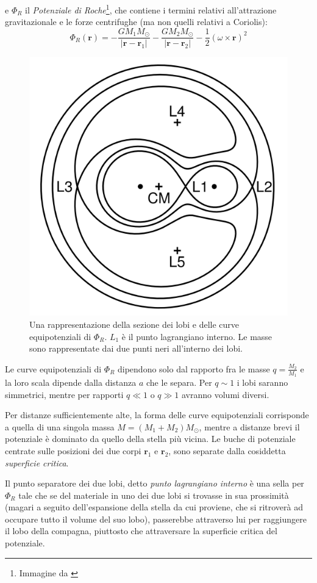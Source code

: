 \documentclass[a4paperbi]{article}
\begin{document}
	e $\Phi_R$ il \textit{Potenziale di Roche}\footnote{Immagine da \cite{FrankKingRaineAccretionPower}}, che contiene i termini relativi all'attrazione gravitazionale e le forze centrifughe (ma non quelli relativi a Coriolis):
	\begin{equation}
		\Phi_R(\textbf{r})=-\frac{GM_1M_\odot}{\vert\textbf{r}-\textbf{r}_1\vert}-\frac{GM_2M_\odot}{\vert\textbf{r}-\textbf{r}_2\vert}-\frac{1}{2}(\omega\times\textbf{r})^2
	\end{equation}
	
	\begin{figure}[H]
		\centering
		\includegraphics[width=0.6\linewidth]{RocheEquipotential}
		\caption{Una rappresentazione della sezione dei lobi e delle curve equipotenziali di $\Phi_R$. $L_1$ è il punto lagrangiano interno. Le masse sono rappresentate dai due punti neri all'interno dei lobi.}
		\label{fig:rocheequipotential}
	\end{figure}
	
	Le curve equipotenziali di $\Phi_R$ dipendono solo dal rapporto fra le masse $q=\frac{M_2}{M_1}$ e la loro scala dipende dalla distanza $a$ che le separa. Per $q\sim1$ i lobi saranno simmetrici, mentre per rapporti $q\ll1$ o $q\gg1$ avranno volumi diversi.
	
	Per distanze sufficientemente alte, la forma delle curve equipotenziali corrisponde a quella di una singola massa $M=(M_1+M_2)M_\odot$, mentre a distanze brevi il potenziale è dominato da quello della stella più vicina. Le buche di potenziale centrate sulle posizioni dei due corpi $\textbf{r}_1$ e $\textbf{r}_2$, sono separate dalla cosiddetta \textit{superficie critica}.
	
	Il punto separatore dei due lobi, detto \textit{punto lagrangiano interno} è una sella per $\Phi_R$ tale che se del materiale in uno dei due lobi si trovasse in sua prossimità (magari a seguito dell'espansione della stella da cui proviene, che si ritroverà ad occupare tutto il volume del suo lobo), passerebbe attraverso lui per raggiungere il lobo della compagna, piuttosto che attraversare la superficie critica del potenziale.
	
\end{document}
